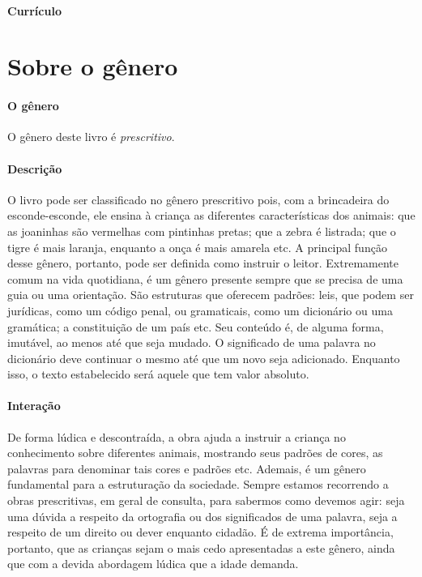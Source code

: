 \documentclass[11pt]{extarticle}
\begin{document}
\paragraph{Currículo} 


\section{Sobre o gênero}

\paragraph{O gênero} O gênero deste livro é \textit{prescritivo}. 

\paragraph{Descrição} O livro pode ser classificado no gênero prescritivo pois, com a brincadeira do esconde-esconde, ele ensina à criança as diferentes características dos animais: que as joaninhas são vermelhas com pintinhas pretas; que a zebra é listrada; que o tigre é mais laranja, enquanto a onça é mais amarela etc. A principal função desse gênero, portanto, pode ser definida como instruir o leitor.
Extremamente comum na vida quotidiana, é um gênero presente
sempre que se precisa de uma guia ou uma orientação. São estruturas 
que oferecem padrões: leis, que podem ser jurídicas, como um código
penal, ou gramaticais, como um dicionário ou uma gramática; a constituição
de um país etc. Seu conteúdo é, de alguma forma, imutável, ao menos até que seja
mudado. O significado de uma palavra no dicionário deve continuar o mesmo
até que um novo seja adicionado. Enquanto isso, o texto
estabelecido será aquele que tem valor absoluto.

\paragraph{Interação} De forma lúdica e descontraída, a obra ajuda a instruir a criança no conhecimento sobre diferentes animais, mostrando seus padrões de cores, as palavras para denominar tais cores e padrões etc. Ademais, é um gênero fundamental para a estruturação da sociedade.
Sempre estamos recorrendo a obras prescritivas, em geral de consulta, para
sabermos como devemos agir: seja uma dúvida a respeito da ortografia ou 
dos significados de uma palavra, seja a respeito de um direito ou dever
enquanto cidadão. É de extrema importância, portanto, que as crianças
sejam o mais cedo apresentadas a este gênero, ainda que com a 
devida abordagem lúdica que a idade demanda.
\end{document}
